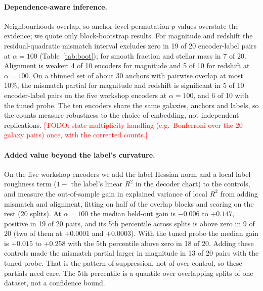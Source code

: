 \documentclass[10pt]{article}
\newcommand{\todo}[1]{\textcolor{red}{[TODO: #1]}}
\begin{document}
\paragraph{Dependence-aware inference.} Neighbourhoods overlap, so anchor-level permutation $p$-values overstate the evidence; we quote only block-bootstrap results. %
For magnitude and redshift the residual-quadratic mismatch interval excludes zero in 19 of 20 encoder-label pairs at $\alpha=100$ (Table~\ref{tab:boot}); for smooth fraction and stellar mass in 7 of 20. Alignment is weaker: 4 of 10 encoders for magnitude and 5 of 10 for redshift at $\alpha=100$. On a thinned set of about 30 anchors with pairwise overlap at most 10\%, the mismatch partial for magnitude and redshift is significant in 5 of 10 encoder-label pairs on the five workshop encoders at $\alpha=100$, and 6 of 10 with the tuned probe. The ten encoders share the same galaxies, anchors and labels, so the counts measure robustness to the choice of embedding, not independent replications. \todo{state multiplicity handling (e.g.\ Bonferroni over the 20 galaxy pairs) once, with the corrected counts.}

\paragraph{Added value beyond the label's curvature.} On the five workshop encoders we add the label-Hessian norm and a local label-roughness term ($1-$ the label's linear $R^2$ in the decoder chart) to the controls, and measure the out-of-sample gain in explained variance of local $R^2$ from adding mismatch and alignment, fitting on half of the overlap blocks and scoring on the rest (20 splits). %
At $\alpha=100$ the median held-out gain is $-0.006$ to $+0.147$, positive in 19 of 20 pairs, and its 5th percentile across splits is above zero in 9 of 20 (two of them at $+0.0001$ and $+0.0003$). %
With the tuned probe the median gain is $+0.015$ to $+0.258$ with the 5th percentile above zero in 18 of 20. Adding these controls made the mismatch partial larger in magnitude in 13 of 20 pairs with the tuned probe. That is the pattern of suppression, not of over-control, so these partials need care. The 5th percentile is a quantile over overlapping splits of one dataset, not a confidence bound.
\end{document}
